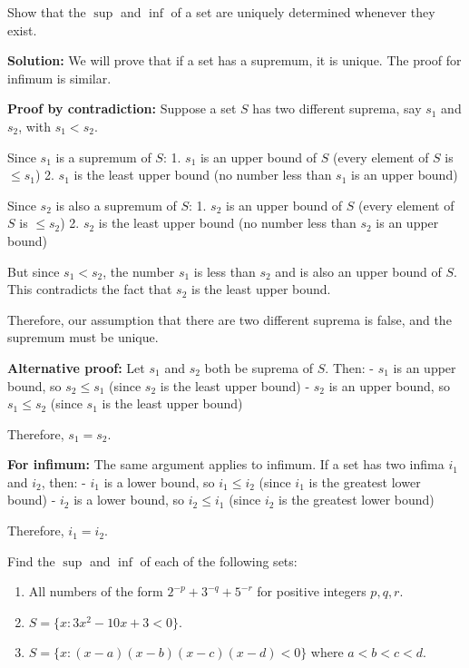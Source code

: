 \begin{problembox}
Show that the $\sup$ and $\inf$ of a set are uniquely determined whenever they exist.
\end{problembox}

\textbf{Solution:}
We will prove that if a set has a supremum, it is unique. The proof for infimum is similar.

\textbf{Proof by contradiction:}
Suppose a set $S$ has two different suprema, say $s_1$ and $s_2$, with $s_1 < s_2$.

Since $s_1$ is a supremum of $S$:
1. $s_1$ is an upper bound of $S$ (every element of $S$ is $\leq s_1$)
2. $s_1$ is the least upper bound (no number less than $s_1$ is an upper bound)

Since $s_2$ is also a supremum of $S$:
1. $s_2$ is an upper bound of $S$ (every element of $S$ is $\leq s_2$)
2. $s_2$ is the least upper bound (no number less than $s_2$ is an upper bound)

But since $s_1 < s_2$, the number $s_1$ is less than $s_2$ and is also an upper bound of $S$. This contradicts the fact that $s_2$ is the least upper bound.

Therefore, our assumption that there are two different suprema is false, and the supremum must be unique.

\textbf{Alternative proof:}
Let $s_1$ and $s_2$ both be suprema of $S$. Then:
- $s_1$ is an upper bound, so $s_2 \leq s_1$ (since $s_2$ is the least upper bound)
- $s_2$ is an upper bound, so $s_1 \leq s_2$ (since $s_1$ is the least upper bound)

Therefore, $s_1 = s_2$.

\textbf{For infimum:}
The same argument applies to infimum. If a set has two infima $i_1$ and $i_2$, then:
- $i_1$ is a lower bound, so $i_1 \leq i_2$ (since $i_1$ is the greatest lower bound)
- $i_2$ is a lower bound, so $i_2 \leq i_1$ (since $i_2$ is the greatest lower bound)

Therefore, $i_1 = i_2$.

\begin{problembox}
Find the $\sup$ and $\inf$ of each of the following sets:
\begin{enumerate}[label=(\alph*)]
\item All numbers of the form $2^{-p} + 3^{-q} + 5^{-r}$ for positive integers $p, q, r$.
\item $S = \{x : 3x^2 - 10x + 3 < 0\}$.
\item $S = \{x : (x - a)(x - b)(x - c)(x - d) < 0\}$ where $a < b < c < d$.
\end{enumerate}
\end{problembox}

